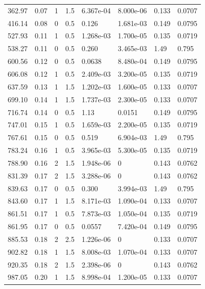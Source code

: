 \documentclass[preview]{standalone}
\begin{document}
{{\begin{tabular}{L{1.2cm}C{1.2cm} C{0.3cm}C{0.5cm} C{1.4cm}C{1.4cm} C{1.4cm}C{1.4cm}}
  362.97  &  0.07  & 1     & 1.5 &  6.367e-04  & 8.000e-06  & 0.133 &  0.0707   \\ 
  416.14  &  0.08  & 0     & 0.5 &  0.126  & 1.681e-03  & 0.149 &  0.0795   \\ 
  527.93  &  0.11  & 1     & 0.5 &  1.268e-03  & 1.700e-05  & 0.135 &  0.0719   \\ 
  538.27  &  0.11  & 0     & 0.5 &  0.260  & 3.465e-03  & 1.49 &  0.795   \\ 
  600.56  &  0.12  & 0     & 0.5 &  0.0638  & 8.480e-04  & 0.149 &  0.0795   \\ 
  606.08  &  0.12  & 1     & 0.5 &  2.409e-03  & 3.200e-05  & 0.135 &  0.0719   \\ 
  637.59  &  0.13  & 1     & 1.5 &  1.202e-03  & 1.600e-05  & 0.133 &  0.0707   \\ 
  699.10  &  0.14  & 1     & 1.5 &  1.737e-03  & 2.300e-05  & 0.133 &  0.0707   \\ 
  716.74  &  0.14  & 0     & 0.5 &  1.13  & 0.0151  & 0.149 &  0.0795   \\ 
  747.01  &  0.15  & 1     & 0.5 &  1.659e-03  & 2.200e-05  & 0.135 &  0.0719   \\ 
  767.61  &  0.15  & 0     & 0.5 &  0.519  & 6.904e-03  & 1.49 &  0.795   \\ 
  783.24  &  0.16  & 1     & 0.5 &  3.965e-03  & 5.300e-05  & 0.135 &  0.0719   \\ 
  788.90  &  0.16  & 2     & 1.5 &  1.948e-06  & 0  & 0.143 &  0.0762   \\ 
  831.39  &  0.17  & 2     & 1.5 &  3.288e-06  & 0  & 0.143 &  0.0762   \\ 
  839.63  &  0.17  & 0     & 0.5 &  0.300  & 3.994e-03  & 1.49 &  0.795   \\ 
  843.60  &  0.17  & 1     & 1.5 &  8.171e-03  & 1.090e-04  & 0.133 &  0.0707   \\ 
  861.51  &  0.17  & 1     & 0.5 &  7.873e-03  & 1.050e-04  & 0.135 &  0.0719   \\ 
  861.95  &  0.17  & 0     & 0.5 &  0.0557  & 7.420e-04  & 0.149 &  0.0795   \\ 
  885.53  &  0.18  & 2     & 2.5 &  1.226e-06  & 0  & 0.133 &  0.0707   \\ 
  902.82  &  0.18  & 1     & 1.5 &  8.008e-03  & 1.070e-04  & 0.133 &  0.0707   \\ 
  920.35  &  0.18  & 2     & 1.5 &  2.398e-06  & 0  & 0.143 &  0.0762   \\ 
  987.05  &  0.20  & 1     & 1.5 &  8.998e-04  & 1.200e-05  & 0.133 &  0.0707   \\ 

\end{tabular}}}
\end{document}
